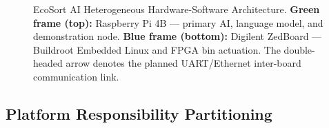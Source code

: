 \documentclass[12pt,a4paper]{article}
\begin{document}
\begin{figure}[H]
{%
}
\caption{EcoSort AI Heterogeneous Hardware-Software Architecture.
         \textbf{Green frame (top):} Raspberry Pi 4B --- primary AI, language model, and
         demonstration node. \textbf{Blue frame (bottom):} Digilent ZedBoard --- Buildroot
         Embedded Linux and FPGA bin actuation. The double-headed arrow denotes the
         planned UART/Ethernet inter-board communication link.}
\label{fig:arch_dual}
\end{figure}

\subsection{Platform Responsibility Partitioning}
\end{document}
